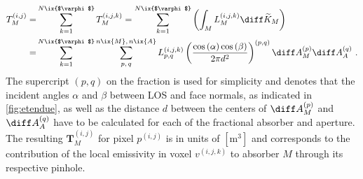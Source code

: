 %
        \begin{align}%
            \begin{split}%
                T^{\left(i,j\right)}_{M}=&\sum_{k=1}^{N\ix{$\varphi$}}T^{\left(i,j,k\right)}_{M}=\sum_{k=1}^{N\ix{$\varphi$}}\left(\int_{M}L^{\left(i,j,k\right)}_{M}\diff\widetilde{K}_{M}\right)\\%
                =&\sum_{k=1}^{N\ix{$\varphi$}}\sum_{p,\,q}^{n\ix{M},\,n\ix{A}}L^{\left(i,j,k\right)}_{p,q}\left(\frac{\cos\left(\alpha\right)\cos\left(\beta\right)}{2\pi d^{2}}\right)^{\left(p,q\right)}\diff A_{M}^{\left(p\right)}\diff A_{A}^{\left(q\right)}\,\,.%
            \end{split}\label{eq:discrete_emissivity}%
        \end{align}%
%
        The supercript $\left(p,q\right)$ on the fraction is used for simplicity and denotes that the incident angles $\alpha$ and $\beta$ between LOS and face normals, as indicated in \cref{fig:etendue}, as well as the distance $d$ between the centers of $\diff A_{M}^{\left(p\right)}$ and $\diff A_{A}^{\left(q\right)}$ have to be calculated for each of the fractional absorber and aperture. The resulting  $\mathbf{T}_{M}^{\left(i,j\right)}$ for pixel $p^{\left(i,j\right)}$ is in units of $\left[\text{m}^{3}\right]$ and corresponds to the contribution of the local emissivity in voxel $v^{\left(i,j,k\right)}$ to absorber $M$ through its respective pinhole.%
%
